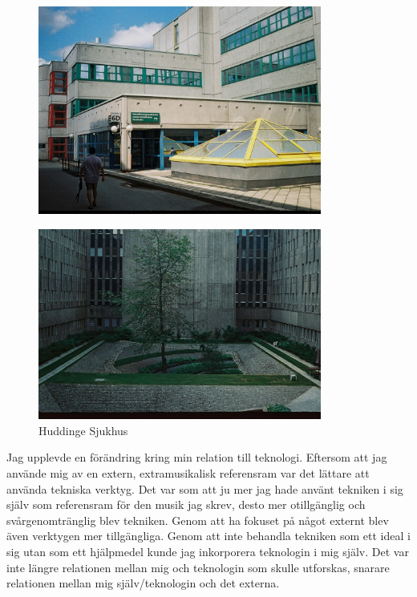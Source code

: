 \documentclass{article}
\begin{document}
\begin{figure}
	\centering
	\includegraphics[keepaspectratio, width=0.83\textwidth]{innergaard2} \\

	\vspace*{-0.3mm}

	\includegraphics[keepaspectratio, width=0.83\textwidth]{innergaard1}
	\caption{Huddinge Sjukhus}
\end{figure}


Jag upplevde en förändring kring min relation till teknologi. Eftersom att jag använde mig av en extern,
extramusikalisk referensram var det lättare att använda tekniska verktyg. Det var som att ju mer jag hade
använt tekniken i sig själv som referensram för den musik jag skrev, desto mer otillgänglig och
svårgenomtränglig blev tekniken. Genom att ha fokuset på något externt blev även verktygen mer tillgängliga.
Genom att inte behandla tekniken som ett ideal i sig utan som ett hjälpmedel kunde jag inkorporera teknologin
i mig själv. Det var inte längre relationen mellan mig och teknologin som skulle utforskas, snarare relationen
mellan mig själv/teknologin och det externa. 
\end{document}
